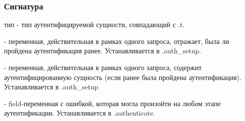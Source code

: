 \subsubsection{Сигнатура\label{signature}}%
\label{page-FPauth-core-module-FPauth+u+core-module-Variables-module-Make-type-entity}\begin{ocamlindent}тип  - тип аутентифицируемой сущности, совпадающий с .t.\end{ocamlindent}%
\medbreak
\label{page-FPauth-core-module-FPauth+u+core-module-Variables-module-Make-val-authenticated}\begin{ocamlindent} - переменная, действительная в рамках одного запроса, отражает, была ли пройдена аутентификация ранее. Устанавливается в .auth\_setup.\end{ocamlindent}%
\medbreak
\label{page-FPauth-core-module-FPauth+u+core-module-Variables-module-Make-val-current+u+user}\begin{ocamlindent} - переменная, действительная в рамках одного запроса, содержит аутентифицированную сущность (если ранее была пройдена аутентификация). Устанавливается в .auth\_setup\end{ocamlindent}%
\medbreak
\label{page-FPauth-core-module-FPauth+u+core-module-Variables-module-Make-val-auth+u+error}\begin{ocamlindent} - field-переменная с ошибкой, которая могла произойти на любом этапе аутентификации. Устанавливается в .authenticate.\end{ocamlindent}%
